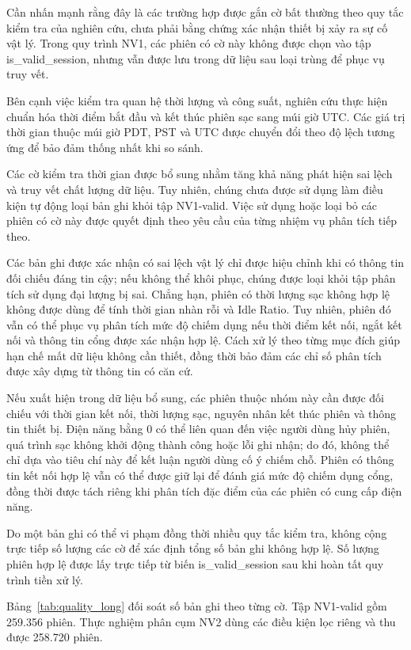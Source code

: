 \documentclass[conference,a4paper]{IEEEtran}
\begin{document}
Cần nhấn mạnh rằng đây là các trường hợp được gắn cờ bất thường theo quy tắc kiểm tra của nghiên cứu, chưa phải bằng chứng xác nhận thiết bị xảy ra sự cố vật lý. Trong quy trình NV1, các phiên có cờ này không được chọn vào tập is\_valid\_session, nhưng vẫn được lưu trong dữ liệu sau loại trùng để phục vụ truy vết.

Bên cạnh việc kiểm tra quan hệ thời lượng và công suất, nghiên cứu thực hiện chuẩn hóa thời điểm bắt đầu và kết thúc phiên sạc sang múi giờ UTC. Các giá trị thời gian thuộc múi giờ PDT, PST và UTC được chuyển đổi theo độ lệch tương ứng để bảo đảm thống nhất khi so sánh.

Các cờ kiểm tra thời gian được bổ sung nhằm tăng khả năng phát hiện sai lệch và truy vết chất lượng dữ liệu. Tuy nhiên, chúng chưa được sử dụng làm điều kiện tự động loại bản ghi khỏi tập NV1-valid. Việc sử dụng hoặc loại bỏ các phiên có cờ này được quyết định theo yêu cầu của từng nhiệm vụ phân tích tiếp theo.

Các bản ghi được xác nhận có sai lệch vật lý chỉ được hiệu chỉnh khi có thông tin đối chiếu đáng tin cậy; nếu không thể khôi phục, chúng được loại khỏi tập phân tích sử dụng đại lượng bị sai. Chẳng hạn, phiên có thời lượng sạc không hợp lệ không được dùng để tính thời gian nhàn rỗi và Idle Ratio. Tuy nhiên, phiên đó vẫn có thể phục vụ phân tích mức độ chiếm dụng nếu thời điểm kết nối, ngắt kết nối và thông tin cổng được xác nhận hợp lệ. Cách xử lý theo từng mục đích giúp hạn chế mất dữ liệu không cần thiết, đồng thời bảo đảm các chỉ số phân tích được xây dựng từ thông tin có căn cứ.

Nếu xuất hiện trong dữ liệu bổ sung, các phiên thuộc nhóm này cần được đối chiếu với thời gian kết nối, thời lượng sạc, nguyên nhân kết thúc phiên và thông tin thiết bị. Điện năng bằng 0 có thể liên quan đến việc người dùng hủy phiên, quá trình sạc không khởi động thành công hoặc lỗi ghi nhận; do đó, không thể chỉ dựa vào tiêu chí này để kết luận người dùng cố ý chiếm chỗ. Phiên có thông tin kết nối hợp lệ vẫn có thể được giữ lại để đánh giá mức độ chiếm dụng cổng, đồng thời được tách riêng khi phân tích đặc điểm của các phiên có cung cấp điện năng.

Do một bản ghi có thể vi phạm đồng thời nhiều quy tắc kiểm tra, không cộng trực tiếp số lượng các cờ để xác định tổng số bản ghi không hợp lệ. Số lượng phiên hợp lệ được lấy trực tiếp từ biến is\_valid\_session sau khi hoàn tất quy trình tiền xử lý.

Bảng~\ref{tab:quality_long} đối soát số bản ghi theo từng cờ. Tập NV1-valid gồm 259.356 phiên. Thực nghiệm phân cụm NV2 dùng các điều kiện lọc riêng và thu được 258.720 phiên.
\end{document}

